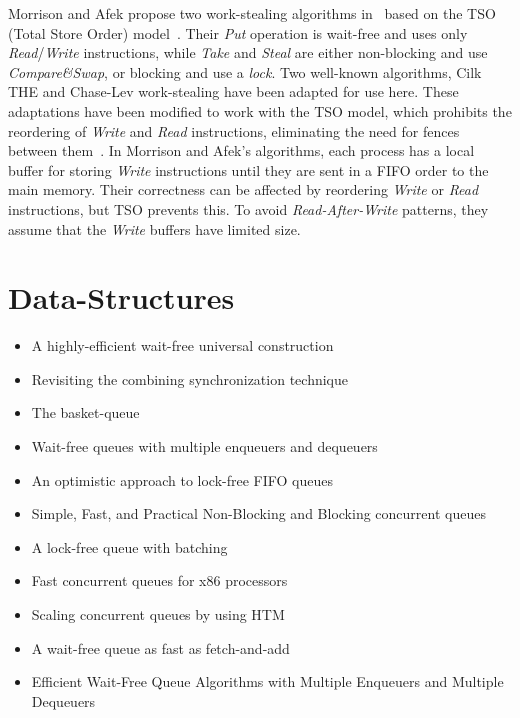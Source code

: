Morrison and Afek propose two work-stealing algorithms in~\cite{fencefreeworkproceedings} based on the TSO (Total Store Order) model~\cite{DBLP_journals_cacm_SewellSONM10}. Their \emph{Put} operation is wait-free and uses only \emph{Read}/\emph{Write} instructions, while \emph{Take} and \emph{Steal} are either non-blocking and use \emph{Compare\&Swap}, or blocking and use a \emph{lock}. Two well-known algorithms, Cilk THE and Chase-Lev work-stealing have been adapted for use here. These adaptations have been modified to work with the TSO model, which prohibits the reordering of \emph{Write} and \emph{Read} instructions, eliminating the need for fences between them~\cite{circular.work.stealing, DBLP_conf_pldi_FrigoLR98}. In Morrison and Afek's algorithms, each process has a local buffer for storing \emph{Write} instructions until they are sent in a FIFO order to the main memory. Their correctness can be affected by reordering \emph{Write} or \emph{Read} instructions, but TSO prevents this. To avoid \emph{Read-After-Write} patterns, they assume that the \emph{Write} buffers have limited size.


\section{\label{section:data-structures}Data-Structures}

\begin{itemize}
    \item A highly-efficient wait-free universal construction~\cite{DBLP_conf_spaa_FatourouK11}
    \item Revisiting the combining synchronization technique~\cite{DBLP_conf_ppopp_FatourouK12}
    \item The basket-queue~\cite{basketqueue2007}
    \item Wait-free queues with multiple enqueuers and dequeuers~\cite{DBLP_conf_ppopp_KoganP11}
    \item An optimistic approach to lock-free FIFO queues~\cite{DBLP_conf_ppopp_KoganP11}
    \item Simple, Fast, and Practical Non-Blocking and Blocking concurrent queues~\cite{DBLP_conf_podc_MichaelS96}
    \item A lock-free queue with batching~\cite{DBLP_journals_topc_Milman-SelaKLLP22}
    \item Fast concurrent queues for x86 processors~\cite{ppopp2013x86queues}
    \item Scaling concurrent queues by using HTM~\cite{scalingconcurrent2020}
    \item A wait-free queue as fast as fetch-and-add~\cite{wfq-ppopp16}
    \item Efficient Wait-Free Queue Algorithms with Multiple Enqueuers and Multiple Dequeuers~\cite{DBLP_conf_opodis_JohnenKM22}
\end{itemize}


